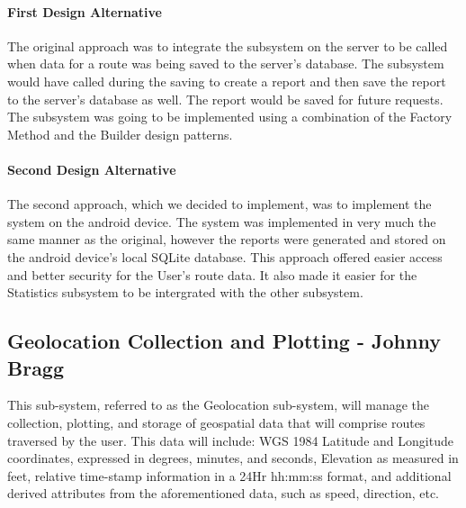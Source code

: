 \documentclass{article}
\begin{document}
\paragraph{First Design Alternative}
The original approach was to integrate the subsystem on the server to be called when data for a route was being saved to the server's database. The subsystem would have called during the saving to create a report and then save the report to the server's database as well. The report would be saved for future requests. The subsystem was going to be implemented using a combination of the Factory Method and the Builder design patterns.
\paragraph{Second Design Alternative}
The second approach, which we decided to implement, was to implement the system on the android device. The system was implemented in very much the same manner as the original, however the reports were generated and stored on the android device's local SQLite database. This approach offered easier access and better security for the User's route data. It also made it easier for the Statistics subsystem to be intergrated with the other subsystem.


\subsection{Geolocation Collection and Plotting - Johnny Bragg}
This sub-system, referred to as the Geolocation sub-system, will manage the collection, plotting, and storage of geospatial data that will comprise routes traversed by the user. This data will include: WGS 1984 Latitude and Longitude coordinates, expressed in degrees, minutes, and seconds, Elevation as measured in feet, relative time-stamp information in a 24Hr hh:mm:ss format, and additional derived attributes from the aforementioned data, such as speed, direction, etc.
\end{document}
